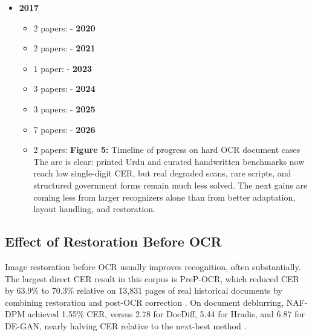     
    \begin{itemize}
    \item \textbf{2017}\begin{itemize}
    \item 2 papers:  \cite{Naz2017Urdu}- \textbf{2020}
    \item 2 papers:  \cite{Dwivedi2020An} \cite{Rizvi2020Deep}- \textbf{2021}
    \item 1 paper:  \cite{Nasir2021MMU-OCR-21:}- \textbf{2023}
    \item 3 papers:  \cite{Mondal2023ICDAR} \cite{Gupta2023Handwritten} \cite{Jindal2023A}- \textbf{2024}
    \item 3 papers:  \cite{Nasir2024Efficient} \cite{Hamza2024ET-Network:} \cite{Jindal2024A}- \textbf{2025}
    \item 7 papers:  \cite{Meghana2025Enhanced} \cite{Dey2025Handwritten} \cite{Akoushideh2025Persian/Arabic} \cite{Equbal2025Few-Shot} \cite{Kasuba2025PLATTER:} \cite{Lalitha2025Enhancing} \cite{Evani2025SemiHastakshar:}- \textbf{2026}
    \item 2 papers:  \cite{Kumar2026Enhancing} \cite{Faraz2026Designing}\textbf{Figure 5:} Timeline of progress on hard OCR document cases
    The arc is clear: printed Urdu and curated handwritten benchmarks now reach low single-digit CER, but real degraded scans, rare scripts, and structured government forms remain much less solved. The next gains are coming less from larger recognizers alone than from better adaptation, layout handling, and restoration.
    \end{itemize}
    
    
    \end{itemize}
    
    
    \subsection*{Effect of Restoration Before OCR}
    
    
    Image restoration before OCR usually improves recognition, often substantially. The largest direct CER result in this corpus is PreP-OCR, which reduced CER by 63.9\% to 70.3\% relative on 13,831 pages of real historical documents by combining restoration and post-OCR correction  \cite{Guan2025PreP-OCR:}. On document deblurring, NAF-DPM achieved 1.55\% CER, versus 2.78 for DocDiff, 5.44 for Hradis, and 6.87 for DE-GAN, nearly halving CER relative to the next-best method  \cite{Cicchetti2024NAF-DPM:}.
    
